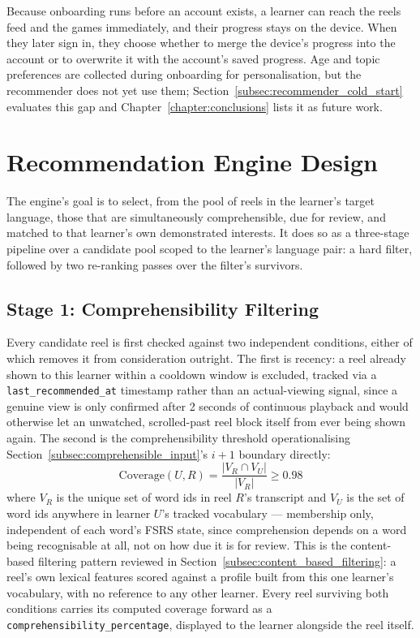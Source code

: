     Because onboarding runs before an account exists, a learner can reach the reels feed and the games immediately, and their progress stays on the device. When they later sign in, they choose whether to merge the device's progress into the account or to overwrite it with the account's saved progress. Age and topic preferences are collected during onboarding for personalisation, but the recommender does not yet use them; Section~\ref{subsec:recommender_cold_start} evaluates this gap and Chapter~\ref{chapter:conclusions} lists it as future work.


\section{Recommendation Engine Design} \label{sec:recommendation}
    The engine's goal is to select, from the pool of reels in the learner's target language, those that are simultaneously comprehensible, due for review, and matched to that learner's own demonstrated interests. It does so as a three-stage pipeline over a candidate pool scoped to the learner's language pair: a hard filter, followed by two re-ranking passes over the filter's survivors.

    \subsection{Stage 1: Comprehensibility Filtering}
    \label{subsec:stage1_design}
    Every candidate reel is first checked against two independent conditions, either of which removes it from consideration outright. The first is recency: a reel already shown to this learner within a cooldown window is excluded, tracked via a \texttt{last\_recommended\_at} timestamp rather than an actual-viewing signal, since a genuine view is only confirmed after 2 seconds of continuous playback and would otherwise let an unwatched, scrolled-past reel block itself from ever being shown again. The second is the comprehensibility threshold operationalising Section~\ref{subsec:comprehensible_input}'s $i+1$ boundary directly:
        \begin{equation}
            \text{Coverage}(U, R) = \frac{|V_R \cap V_U|}{|V_R|} \ge 0.98
        \end{equation}
        where $V_R$ is the unique set of word ids in reel $R$'s transcript and $V_U$ is the set of word ids anywhere in learner $U$'s tracked vocabulary --- membership only, independent of each word's FSRS state, since comprehension depends on a word being recognisable at all, not on how due it is for review. This is the content-based filtering pattern reviewed in Section~\ref{subsec:content_based_filtering}: a reel's own lexical features scored against a profile built from this one learner's vocabulary, with no reference to any other learner. Every reel surviving both conditions carries its computed coverage forward as a \texttt{comprehensibility\_percentage}, displayed to the learner alongside the reel itself.

